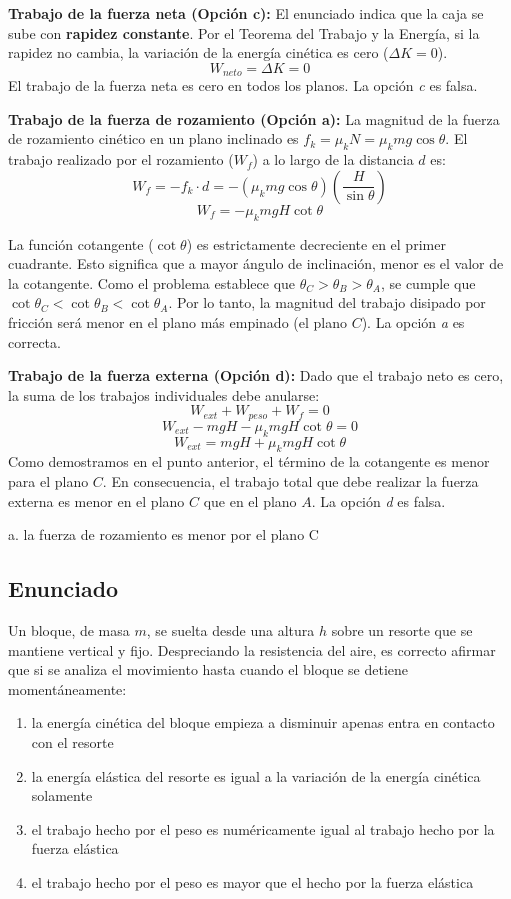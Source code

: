 \documentclass[12pt, a4paper]{article}
\begin{document}
\textbf{Trabajo de la fuerza neta (Opción c):}
El enunciado indica que la caja se sube con \textbf{rapidez constante}. Por el Teorema del Trabajo y la Energía, si la rapidez no cambia, la variación de la energía cinética es cero ($\Delta K = 0$).
$$W_{neto} = \Delta K = 0$$
El trabajo de la fuerza neta es cero en todos los planos. La opción \textit{c} es falsa.

\textbf{Trabajo de la fuerza de rozamiento (Opción a):}
La magnitud de la fuerza de rozamiento cinético en un plano inclinado es $f_k = \mu_k N = \mu_k mg \cos\theta$.
El trabajo realizado por el rozamiento ($W_f$) a lo largo de la distancia $d$ es:
$$W_f = -f_k \cdot d = -(\mu_k mg \cos\theta) \left( \frac{H}{\sin\theta} \right)$$
$$W_f = -\mu_k mgH \cot\theta$$

La función cotangente ($\cot\theta$) es estrictamente decreciente en el primer cuadrante. Esto significa que a mayor ángulo de inclinación, menor es el valor de la cotangente.
Como el problema establece que $\theta_C > \theta_B > \theta_A$, se cumple que $\cot\theta_C < \cot\theta_B < \cot\theta_A$.
Por lo tanto, la magnitud del trabajo disipado por fricción será menor en el plano más empinado (el plano $C$). La opción \textit{a} es correcta.

\textbf{Trabajo de la fuerza externa (Opción d):}
Dado que el trabajo neto es cero, la suma de los trabajos individuales debe anularse:
$$W_{ext} + W_{peso} + W_f = 0$$
$$W_{ext} - mgH - \mu_k mgH \cot\theta = 0$$
$$W_{ext} = mgH + \mu_k mgH \cot\theta$$
Como demostramos en el punto anterior, el término de la cotangente es menor para el plano $C$. En consecuencia, el trabajo total que debe realizar la fuerza externa es menor en el plano $C$ que en el plano $A$. La opción \textit{d} es falsa.

\begin{tcolorbox}[colback=green!5!white, colframe=green!50!black, title=Respuesta Correcta]
\centering \Large a. la fuerza de rozamiento es menor por el plano C
\end{tcolorbox}

\newpage

\subsection*{Enunciado}
Un bloque, de masa $m$, se suelta desde una altura $h$ sobre un resorte que se mantiene vertical y fijo. Despreciando la resistencia del aire, es correcto afirmar que si se analiza el movimiento hasta cuando el bloque se detiene momentáneamente:
\begin{enumerate}[label=\alph*.]
    \item la energía cinética del bloque empieza a disminuir apenas entra en contacto con el resorte
    \item la energía elástica del resorte es igual a la variación de la energía cinética solamente
    \item el trabajo hecho por el peso es numéricamente igual al trabajo hecho por la fuerza elástica
    \item el trabajo hecho por el peso es mayor que el hecho por la fuerza elástica
\end{enumerate}
\end{document}
